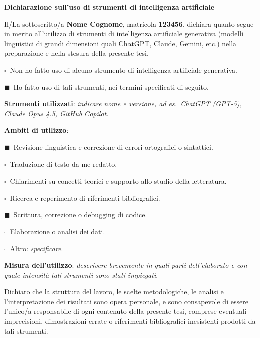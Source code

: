 \documentclass[12pt, a4paper, oneside, openright]{book}
\theoremstyle{definition}
\numberwithin{definition}{chapter}
\theoremstyle{definition}
\numberwithin{assumption}{chapter}
\theoremstyle{remark}
\numberwithin{example}{chapter}
\theoremstyle{remark}
\numberwithin{remark}{chapter}
\theoremstyle{plain}
\numberwithin{theorem}{chapter}
\numberwithin{corollary}{chapter}
\numberwithin{lemma}{chapter}
\numberwithin{proposition}{chapter}
\newenvironment{aideclaration}%
    {\cleardoublepage\null\vfill\begin{center}\bfseries Dichiarazione sull'uso di strumenti di intelligenza artificiale\end{center}\medskip}%
    {\vfill\null}
\newcommand{\aibox}{$\square$~}
\newcommand{\aiboxx}{$\blacksquare$~}
\begin{document}
\begin{aideclaration}
Il/La sottoscritto/a \textbf{Nome Cognome}, matricola \textbf{123456}, dichiara quanto segue in merito all'utilizzo di strumenti di intelligenza artificiale generativa (modelli linguistici di grandi dimensioni quali ChatGPT, Claude, Gemini, etc.) nella preparazione e nella stesura della presente tesi.

\medskip
\aibox Non ho fatto uso di alcuno strumento di intelligenza artificiale generativa.

\aiboxx Ho fatto uso di tali strumenti, nei termini specificati di seguito.

\medskip
\noindent\textbf{Strumenti utilizzati}: \textit{indicare nome e versione, ad es.\ ChatGPT (GPT-5), Claude Opus 4.5, GitHub Copilot}.

\medskip
\noindent\textbf{Ambiti di utilizzo}:

\medskip
\noindent\aiboxx Revisione linguistica e correzione di errori ortografici o sintattici.

\noindent\aibox Traduzione di testo da me redatto.

\noindent\aibox Chiarimenti su concetti teorici e supporto allo studio della letteratura.

\noindent\aibox Ricerca e reperimento di riferimenti bibliografici.

\noindent\aiboxx Scrittura, correzione o debugging di codice.

\noindent\aibox Elaborazione o analisi dei dati.

\noindent\aibox Altro: \textit{specificare}.

\medskip
\noindent\textbf{Misura dell'utilizzo}: \textit{descrivere brevemente in quali parti dell'elaborato e con quale intensità tali strumenti sono stati impiegati}.

\medskip
Dichiaro che la struttura del lavoro, le scelte metodologiche, le analisi e l'interpretazione dei risultati sono opera personale, e sono consapevole di essere l'unico/a responsabile di ogni contenuto della presente tesi, comprese eventuali imprecisioni, dimostrazioni errate o riferimenti bibliografici inesistenti prodotti da tali strumenti.

\end{aideclaration}

\cleardoublepage

\end{document}
